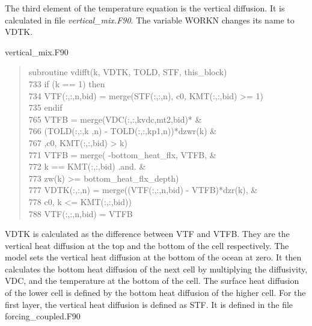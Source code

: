 \begin{appendices}
The third element of the temperature equation is the vertical diffusion. It is calculated in file \textit{vertical\_mix.F90}. The variable WORKN changes its name to VDTK. 
\begin{center} vertical\_mix.F90 \end{center}
\begin{quotation}
\small
\linespread{0.5}\selectfont{} \hspace{1em} subroutine vdifft(k, VDTK, TOLD, STF, this\_block)\\
733 \hspace{1em} if (k == 1) then\\
734 \hspace{1em}        VTF(:,:,n,bid) = merge(STF(:,:,n), c0, KMT(:,:,bid) >= 1)\\
735 \hspace{1em}     endif\\
765 \hspace{1em}         VTFB = merge(VDC(:,:,kvdc,mt2,bid)*                      \&\\
766 \hspace{1em}                     (TOLD(:,:,k  ,n) - TOLD(:,:,kp1,n))*dzwr(k) \&\\
767 \hspace{1em}                     ,c0, KMT(:,:,bid) > k)\\
771  \hspace{1em}          VTFB = merge( -bottom\_heat\_flx, VTFB,      \&\\
 772  \hspace{1em}                      k == KMT(:,:,bid) .and.       \&\\
773   \hspace{1em}                      zw(k) >= bottom\_heat\_flx\_depth)\\
777   \hspace{1em}      VDTK(:,:,n) = merge((VTF(:,:,n,bid) - VTFB)*dzr(k), \&\\
 778   \hspace{1em}                         c0, k <= KMT(:,:,bid))\\
  788   \hspace{1em}       VTF(:,:,n,bid) = VTFB  \\
\end{quotation}
VDTK is calculated as the difference between VTF and VTFB. They are the vertical heat diffusion at the top and the bottom of the cell respectively. The model sets the vertical heat diffusion at the bottom of the ocean at zero. It then calculates the bottom heat diffusion of the next cell by multiplying the diffusivity, VDC, and the temperature at the bottom of the cell. The surface heat diffusion of the lower cell is defined by the bottom heat diffusion of the higher cell. For the first layer, the vertical heat diffusion is defined as STF. It is defined in the file forcing\_coupled.F90

\end{appendices}
